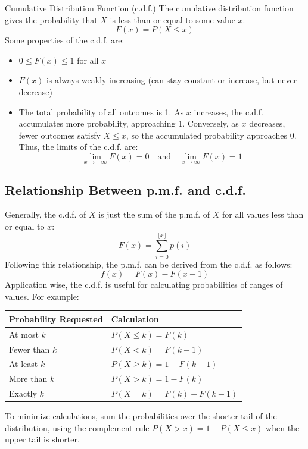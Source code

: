 ﻿\documentclass[12pt]{article}
\begin{document}
\begin{definition}{Cumulative Distribution Function (c.d.f.)}
    The cumulative distribution function gives the probability that \(X\) is less than or equal to some value \(x\).
    \[\boxed{F(x)=P(X\leq x)}\]
    Some properties of the c.d.f. are:
    \begin{itemize}
        \item $0 \leq F(x) \leq 1$ for all $x$
        \item $F(x)$ is always weakly increasing (can stay constant or increase, but never decrease)
        \item The total probability of all outcomes is 1. As \(x\) increases, the c.d.f. accumulates more probability, approaching 1. Conversely, as \(x\) decreases, fewer outcomes satisfy \(X\leq x\), so the accumulated probability approaches 0. Thus, the limits of the c.d.f. are:
        \[\lim_{x \to -\infty} F(x) = 0 \quad \text{and} \quad \lim_{x \to \infty} F(x) = 1\]
    \end{itemize}
\end{definition}
\subsection*{Relationship Between p.m.f. and c.d.f.}
Generally, the c.d.f. of $X$ is just the sum of the p.m.f. of $X$ for all values less than or equal to $x$:
\[F(x) = \sum_{i=0}^{\lfloor x \rfloor} p(i)\]
Following this relationship, the p.m.f. can be derived from the c.d.f. as follows:
\[f(x) = F(x) - F(x-1)\]
Application wise, the c.d.f. is useful for calculating probabilities of ranges of values. For example:
\begin{center}
\begin{tabular}{ll}
\hline
\textbf{Probability Requested} & \textbf{Calculation} \\
\hline
At most $k$    & $P(X \leq k) = F(k)$ \\
Fewer than $k$ & $P(X < k) = F(k-1)$ \\
At least $k$   & $P(X \geq k) = 1-F(k-1)$ \\
More than $k$  & $P(X > k) = 1-F(k)$ \\
Exactly $k$    & $P(X = k) = F(k)-F(k-1)$ \\
\hline
\end{tabular}
\end{center}
To minimize calculations, sum the probabilities over the shorter tail of the distribution, using the complement rule $P(X> x)=1-P(X\leq x)$ when the upper tail is shorter.
\end{document}
